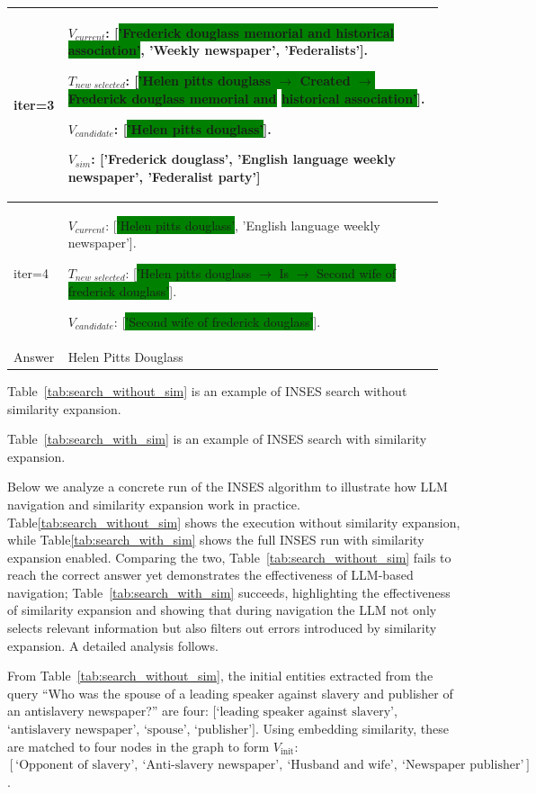 \documentclass{article}
\theoremstyle{plain}
\theoremstyle{definition}
\theoremstyle{remark}
\begin{document}
\begin{table}[htb]
\begin{tabular}{p{0.1\linewidth}|p{0.85\linewidth}}
    \hline
    iter=3  & $V_{current}$: [\colorbox{green}{'Frederick douglass memorial and historical association'}, 'Weekly newspaper', 'Federalists']. \par$T_{new\_selected}$: [\colorbox{green}{'Helen pitts douglass $\rightarrow$ Created $\rightarrow$ Frederick douglass memorial and} \colorbox{green}{historical association'}]. \par$V_{candidate}$: [\colorbox{green}{'Helen pitts douglass'}]. \par$V_{sim}$: ['Frederick douglass', 'English language weekly newspaper', 'Federalist party']\\
    \hline
    iter=4  & $V_{current}$: [\colorbox{green}{'Helen pitts douglass'}, 'English language weekly newspaper']. \par$T_{new\_selected}$: [\colorbox{green}{'Helen pitts douglass $\rightarrow$ Is $\rightarrow$ Second wife of frederick douglass'}]. \par$V_{candidate}$: [\colorbox{green}{'Second wife of frederick douglass'}]. \\
    \hline
    Answer  & Helen Pitts Douglass \\
    \bottomrule
  \end{tabular}
\end{table}

Table~\ref{tab:search_without_sim} is an example of INSES search without similarity expansion.

Table~\ref{tab:search_with_sim} is an example of INSES search with similarity expansion.

Below we analyze a concrete run of the INSES algorithm to illustrate how LLM navigation and similarity expansion work in practice. Table\ref{tab:search_without_sim} shows the execution without similarity expansion, while Table\ref{tab:search_with_sim} shows the full INSES run with similarity expansion enabled. Comparing the two, Table~\ref{tab:search_without_sim} fails to reach the correct answer yet demonstrates the effectiveness of LLM-based navigation; Table~\ref{tab:search_with_sim} succeeds, highlighting the effectiveness of similarity expansion and showing that during navigation the LLM not only selects relevant information but also filters out errors introduced by similarity expansion. A detailed analysis follows.

From Table~\ref{tab:search_without_sim}, the initial entities extracted from the query “Who was the spouse of a leading speaker against slavery and publisher of an antislavery newspaper?” are four: $[\text{‘leading speaker against slavery’}$, $\text{‘antislavery newspaper’}$, $\text{‘spouse’}$, $\text{‘publisher’}]$. Using embedding similarity, these are matched to four nodes in the graph to form $V_{\text{init}}$: $[\text{‘Opponent of slavery’},\ \text{‘Anti-slavery newspaper’},\ \text{‘Husband and wife’},\ \text{‘Newspaper publisher’}]$.
\end{document}
